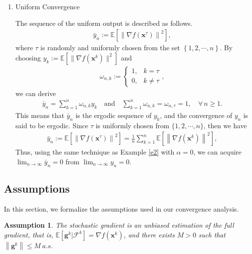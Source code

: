\documentclass[twoside,11pt]{article}
\newtheorem{assumption}{Assumption}
\begin{document}
\begin{example}
\begin{enumerate}
\item[$(2)$] Uniform Convergence \citep{zou2018weighted,liu2022hyper}
\par The sequence of the uniform output is described as follows.
\begin{align*}
	\bar{y}_{n}
	:=
	\mathbb{E}\left[\left\| \nabla f(\mathbf{x}^{\tau})\right\|^2\right],
\end{align*}
where $\tau$ is randomly and uniformly chosen from the set $\left\lbrace 1,2,\cdots,n\right\rbrace$. By choosing $y_{k}:=\mathbb{E}[\lVert\nabla f(\mathbf{x}^{k})\rVert^{2}]$ and
\begin{align*}
	\omega_{n,k}
	:=
	\begin{cases}
		1,&k=\tau\\
		0,&k\neq \tau
	\end{cases},
\end{align*}
we can derive 
\begin{align*}
	\bar{y}_{n}
	=\sum_{k=1}^{n}
	\omega_{n,k}y_{k}
	\quad \text{and}
	\quad 
	\sum_{k=1}^{n}
	\omega_{n,k}=
	\omega_{n,\tau}
	=1,\quad 
	\forall\,n\geq 1.
\end{align*}
This means that $\bar{y}_{n}$ is the ergodic sequence of $y_{k}$, and the convergence of $y_{n}$ is said to be ergodic. Since $\tau$ is uniformly chosen from $\{1, 2, \cdots, n\}$, then we have
\begin{align*}
	\bar{y}_{n}
	:=\mathbb{E}\left[\left\| \nabla f(\mathbf{x}^{\tau})\right\|^2\right]
	=\frac{1}{n}\sum_{k=1}^{n}
	\mathbb{E}\left[\left\| \nabla f(\mathbf{x}^k)\right\|^2\right],
\end{align*}	
Thus, using the same technique as Example \ref{e2} with $\alpha=0$, we can acquire  $\lim_{n\to\infty}\bar{y}_{n}=0$ from $\lim_{n\to\infty}y_{n}=0$.
\end{enumerate}
\end{example}

\subsection{Assumptions}\label{jiashe}
In this section, we formalize the assumptions used in our convergence analysis.
\begin{assumption}\label{Assunbia}
The stochastic gradient is an unbiased estimation of the full gradient,  that is, $\mathbb{E}\left[ \mathbf{g}^k|\mathcal{F}^k\right] =\nabla f(\mathbf{x}^k)$, and there exists $M>0$ such that $\left\| \mathbf{g}^k\right\| \le M\ a.s.$
\end{assumption}
\end{document}
